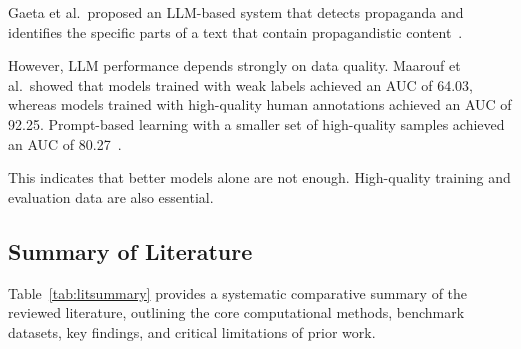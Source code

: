\documentclass[12pt,a4paper]{report}
\begin{document}
Gaeta et al.\ proposed an LLM-based system that detects propaganda and identifies
the specific parts of a text that contain propagandistic content~\cite{gaeta2025}.

However, LLM performance depends strongly on data quality. Maarouf et al.\ showed
that models trained with weak labels achieved an AUC of 64.03, whereas models
trained with high-quality human annotations achieved an AUC of 92.25. Prompt-based
learning with a smaller set of high-quality samples achieved an AUC of
80.27~\cite{maarouf2024}.

This indicates that better models alone are not enough. High-quality training and
evaluation data are also essential.

\subsection{Summary of Literature}
\label{sec:lit-summary}
Table~\ref{tab:litsummary} provides a systematic comparative summary of the
reviewed literature, outlining the core computational methods, benchmark datasets,
key findings, and critical limitations of prior work.
\end{document}
